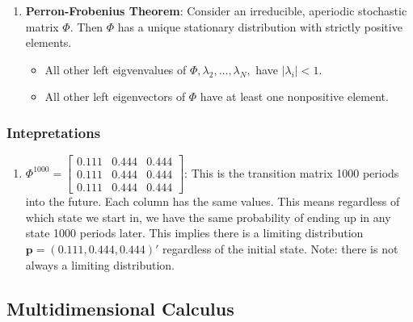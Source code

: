 \documentclass{article}
\begin{document}
\begin{itemize}
\begin{enumerate}
    \item \textbf{Perron-Frobenius Theorem}: Consider an irreducible, aperiodic
    stochastic matrix $ \Phi $. Then $ \Phi $ has a unique stationary 
    distribution with strictly positive elements.
    \begin{itemize}
        \item All other left eigvenvalues of $ \Phi, \lambda_2, \dots, 
        \lambda_N, $ have $ |\lambda_i| < 1 $.
        \item All other left eigenvectors of $ \Phi $ have at least one 
        nonpositive element. 
    \end{itemize}
    \end{enumerate}
\end{itemize}
\subsubsection{Intepretations}
\begin{enumerate}
    \item $ \Phi^{1000} = \begin{bmatrix}
        0.111 & 0.444 & 0.444 \\
        0.111 & 0.444 & 0.444 \\
        0.111 & 0.444 & 0.444
        \end{bmatrix} $: This is the transition matrix 1000 periods into the 
        future. Each column has the same values. This means regardless of which
        state we start in, we have the same probability of ending up in any
        state 1000 periods later. This implies there is a limiting distribution 
        $ \textbf{p} = (0.111, 0.444, 0.444)' $ regardless of the initial state. 
        Note: there is not always a limiting distribution. 
\end{enumerate}

\subsection{Multidimensional Calculus}
\end{document}
